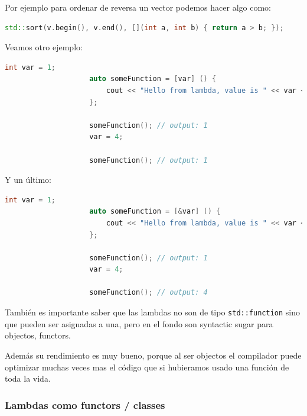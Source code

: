 \documentclass[12pt, fleqn]{report}                             %
\theoremstyle{break}                                            %
\newcommand{\textCode}[1]  { \texttt{#1} }                      %
\begin{document}
                Por ejemplo para ordenar de reversa un vector podemos hacer algo como:
                \begin{lstlisting}[language=C++, gobble=20]
                    std::sort(v.begin(), v.end(), [](int a, int b) { return a > b; });
                \end{lstlisting}
                
                Veamos otro ejemplo:
                \begin{lstlisting}[language=C++, gobble=20]
                    int var = 1;
                    auto someFunction = [var] () { 
                        cout << "Hello from lambda, value is " << var << '\n';
                    };

                    someFunction(); // output: 1
                    var = 4;

                    someFunction(); // output: 1
                \end{lstlisting}

                Y un último:
                \begin{lstlisting}[language=C++, gobble=20]
                    int var = 1;
                    auto someFunction = [&var] () { 
                        cout << "Hello from lambda, value is " << var << '\n';
                    };

                    someFunction(); // output: 1
                    var = 4;

                    someFunction(); // output: 4
                \end{lstlisting}

                También es importante saber que las lambdas no son de tipo \textCode{std::function}
                sino que pueden ser asignadas a una, pero en el fondo son syntactic sugar para objectos,
                functors.

                Además su rendimiento es muy bueno, porque al ser objectos el compilador puede optimizar
                muchas veces mas el código que si hubieramos usado una función de toda la vida.


                \subsubsection{Lambdas como functors / classes}
                
\end{document}
